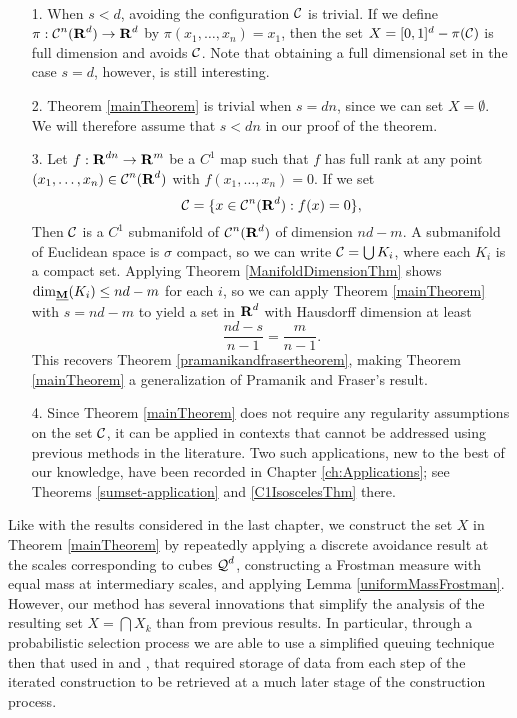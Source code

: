 \begin{remarks}
	\
	\begin{enumerate}
		\item[1.] When $s < d$, avoiding the configuration $\operatorname{\mathcal{C}}$ is trivial. If we define $\pi: \operatorname{\mathcal{C}}^n(\operatorname{\mathbf{R}}^d) \to \operatorname{\mathbf{R}}^d$ by $\pi(x_1, \dots, x_n) = x_1$, then the set $X = [0,1]^d - \pi(\operatorname{\mathcal{C}})$ is full dimension and avoids $\operatorname{\mathcal{C}}$. Note that obtaining a full dimensional set in the case $s = d$, however, is still interesting.

		\item[2.] Theorem \ref{mainTheorem} is trivial when $s = dn$, since we can set $X = \emptyset$. We will therefore assume that $s < dn$ in our proof of the theorem.

		\item[3.] Let $f: \operatorname{\mathbf{R}}^{dn} \to \operatorname{\mathbf{R}}^m$ be a $C^1$ map such that $f$ has full rank at any point $(x_1, \dots, x_n) \in \operatorname{\mathcal{C}}^n(\operatorname{\mathbf{R}}^d)$ with $f(x_1, \dots, x_n) = 0$. If we set
		\[ \operatorname{\mathcal{C}} = \{ x \in \operatorname{\mathcal{C}}^n(\operatorname{\mathbf{R}}^d) : f(x) = 0 \}, \]
		Then $\operatorname{\mathcal{C}}$ is a $C^1$ submanifold of $\operatorname{\mathcal{C}}^n(\operatorname{\mathbf{R}}^d)$ of dimension $nd - m$. A submanifold of Euclidean space is $\sigma$ compact, so we can write $\operatorname{\mathcal{C}} = \bigcup K_i$, where each $K_i$ is a compact set. Applying Theorem \ref{ManifoldDimensionThm} shows $\operatorname{\dim_{\underline{\mathbf{M}}}}(K_i) \leq nd - m$ for each $i$, so we can apply Theorem \ref{mainTheorem} with $s = nd - m$ to yield a set in $\operatorname{\mathbf{R}}^d$ with Hausdorff dimension at least
		\[ \frac{nd - s}{n-1} = \frac{m}{n-1}. \]
		This recovers Theorem \ref{pramanikandfrasertheorem}, making Theorem \ref{mainTheorem} a generalization of Pramanik and Fraser's result.

		\item[4.] Since Theorem \ref{mainTheorem} does not require any regularity assumptions on the set $\operatorname{\mathcal{C}}$, it can be applied in contexts that cannot be addressed using previous methods in the literature. Two such applications, new to the best of our knowledge, have been recorded in Chapter \ref{ch:Applications}; see Theorems \ref{sumset-application} and \ref{C1IsoscelesThm} there.
	\end{enumerate}
\end{remarks}

Like with the results considered in the last chapter, we construct the set $X$ in Theorem \ref{mainTheorem} by repeatedly applying a discrete avoidance result at the scales corresponding to cubes $\operatorname{\mathcal{Q}}^d$, constructing a Frostman measure with equal mass at intermediary scales, and applying Lemma \ref{uniformMassFrostman}. However, our method has several innovations that simplify the analysis of the resulting set $X = \bigcap X_k$ than from previous results. In particular, through a probabilistic selection process we are able to use a simplified queuing technique then that used in \cite{MalabikaRob} and \cite{KeletiDimOneSet}, that required storage of data from each step of the iterated construction to be retrieved at a much later stage of the construction process.

